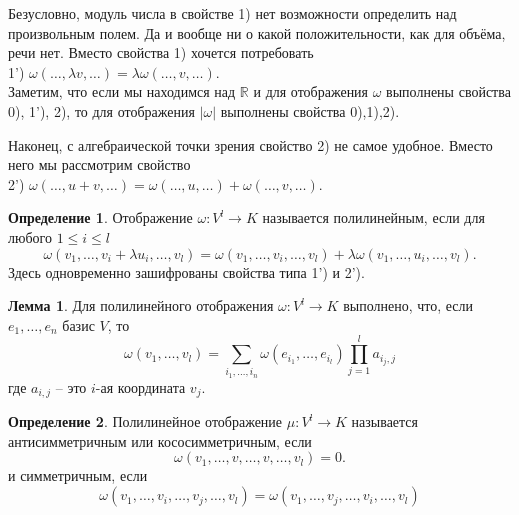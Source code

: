 \documentclass[10pt,a4paper,oneside]{book} %
\theoremstyle{definition}
\newtheorem*{defn}{Определение}
\newtheorem{lem}{Лемма}
\newcommand{\mb}[1]{\mathbb{#1}}
\def\lm{\begin{lem}}
\def\elm{\end{lem}}
\begin{document}
Безусловно, модуль числа в свойстве 1) нет возможности определить над произвольным полем. Да и вообще ни о какой положительности, как для объёма, речи нет. Вместо свойства 1) хочется потребовать\\
1') $\omega(\dots,\lambda v,\dots)=\lambda \omega(\dots,v,\dots)$.\\
Заметим, что если мы находимся над $\mb R$ и  для отображения $\omega$ выполнены свойства 0), 1'), 2), то для отображения $|\omega|$ выполнены свойства 0),1),2). 

Наконец, с алгебраической точки зрения свойство 2) не самое удобное. Вместо него мы рассмотрим свойство\\
2') $\omega(\dots,u+v,\dots)=\omega(\dots,u,\dots)+\omega(\dots,v,\dots)$.


\begin{defn}
Отображение $\omega \colon  V^l\to K $ называется полилинейным, если для любого $1\leq i\leq l$
$$\omega(v_1,\dots,v_i+\lambda u_i,\dots, v_l)= \omega(v_1,\dots,v_i,\dots, v_l)+\lambda\omega(v_1,\dots,u_i,\dots, v_l).$$
Здесь одновременно зашифрованы свойства типа 1')  и  2').
\end{defn}

\lm Для полилинейного отображения $\omega \colon V^l \to K $ выполнено, что, если $e_1,\dots,e_n$ базис $V$, то
$$\omega(v_1,\dots,v_l)=\sum_{i_1,\dots,i_n} \omega(e_{i_1},\dots,e_{i_l}) \prod_{j=1}^l a_{i_j,j}$$
где $a_{i,j}$ -- это $i$-ая координата $v_j$.\\
\elm

\begin{defn}
Полилинейное отображение $\mu \colon V^l\to K $ называется антисимметричным или кососимметричным, если
$$\omega(v_1,\dots,v,\dots,v,\dots, v_l)=0.$$ и симметричным, если
$$\omega(v_1,\dots,v_i,\dots,v_j,\dots, v_l)=\omega(v_1,\dots,v_j,\dots,v_i,\dots, v_l)$$
\end{defn}
\end{document}
